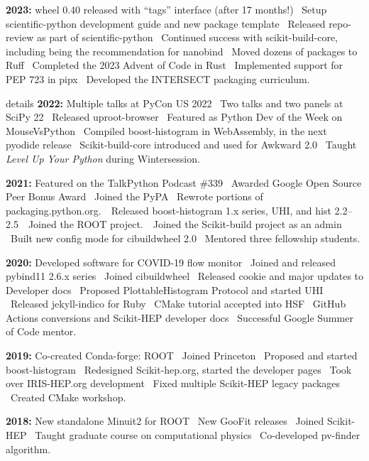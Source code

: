 \documentclass[10pt,letterpaper]{moderncv}
\begin{document}
\textbf{2023:}
wheel 0.40 released with ``tags'' interface (after 17 months!) \textbullet\
Setup scientific-python development guide and new package template \textbullet\
Released repo-review as part of scientific-python \textbullet\
Continued success with scikit-build-core, including being the recommendation for nanobind \textbullet\
Moved dozens of packages to Ruff \textbullet\
Completed the 2023 Advent of Code in Rust \textbullet\
Implemented support for PEP 723 in pipx \textbullet\
Developed the INTERSECT packaging curriculum.

\begin{taggedblock}{details}
\textbf{2022:}
Multiple talks at PyCon US 2022 \textbullet\
Two talks and two panels at SciPy 22 \textbullet\
Released uproot-browser \textbullet\
Featured as Python Dev of the Week on MouseVsPython \textbullet\
Compiled boost-histogram in WebAssembly, in the next pyodide release \textbullet\
Scikit-build-core introduced and used for Awkward 2.0 \textbullet\
Taught \emph{Level Up Your Python} during Wintersession.

\textbf{2021:}
Featured on the TalkPython Podcast \#339 \textbullet\
Awarded Google Open Source Peer Bonus Award \textbullet\
Joined the PyPA \textbullet\ Rewrote portions of packaging.python.org.\ \textbullet\
Released boost-histogram 1.x series, UHI, and hist 2.2--2.5\ \textbullet\
Joined the ROOT project.\ \textbullet\
Joined the Scikit-build project as an admin \textbullet\
Built new config mode for cibuildwheel 2.0 \textbullet\
Mentored three fellowship students.

\textbf{2020:}
Developed software for COVID-19 flow monitor \textbullet\
Joined and released pybind11 2.6.x series \textbullet\
Joined cibuildwheel \textbullet\
Released cookie and major updates to Developer docs \textbullet\
Proposed PlottableHistogram Protocol and started UHI \textbullet\
Released jekyll-indico for Ruby \textbullet\
CMake tutorial accepted into HSF \textbullet\
GitHub Actions conversions and Scikit-HEP developer docs \textbullet\
Successful Google Summer of Code mentor.

\textbf{2019:}
Co-created Conda-forge: ROOT \textbullet\
Joined Princeton \textbullet\
Proposed and started boost-histogram \textbullet\
Redesigned Scikit-hep.org, started the developer pages \textbullet\
Took over IRIS-HEP.org development \textbullet\
Fixed multiple Scikit-HEP legacy packages \textbullet\ Created CMake workshop.

\textbf{2018:} New standalone Minuit2 for ROOT \textbullet\
New GooFit releases \textbullet\
Joined Scikit-HEP \textbullet\
Taught graduate course on computational physics \textbullet\
Co-developed pv-finder algorithm.
\end{taggedblock}
\end{document}
